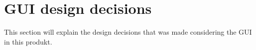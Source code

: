 \section{GUI design decisions}
This section will explain the design decisions that was made considering the GUI in this produkt.


